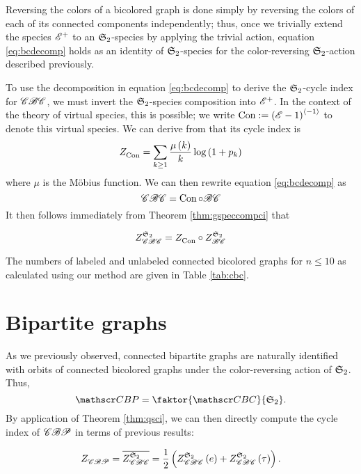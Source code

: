 \documentclass[sectionflow,singlespace,twoside,boldmathhdr,draft]{brandiss} %
\numberwithin{section}{chapter}
\numberwithin{figure}{chapter}
\begin{document}
Reversing the colors of a bicolored graph is done simply by reversing the colors of each of its connected components independently; thus, once we trivially extend the species $\specname{E}^{+}$ to an $\symgp{2}$-species by applying the trivial action, equation \eqref{eq:bcdecomp} holds as an identity of $\symgp{2}$-species for the color-reversing $\symgp{2}$-action described previously.

To use the decomposition in equation \eqref{eq:bcdecomp} to derive the $\symgp{2}$-cycle index for $\specname{CBC}$, we must invert the $\symgp{2}$-species composition into $\specname{E}^{+}$.
In the context of the theory of virtual species, this is possible; we write $\con := \pbrac{\specname{E} - 1}^{\abrac{-1}}$ to denote this virtual species.
We can derive from \cite[\S 2.5, eq.~(58c)]{bll:species} that its cycle index is
\begin{equation}
  \label{eq:zgamma}
  \ci{\con} = \sum_{k \geq 1} \frac{\mu \pbrac{k}}{k} \log \pbrac{1 + p_{k}}
\end{equation}
where $\mu$ is the M\"{o}bius function.
We can then rewrite equation \eqref{eq:bcdecomp} as
\[\specname{CBC} = \con \circ \specname{BC}\]
It then follows immediately from Theorem \ref{thm:gspeccompci} that
\begin{theorem}
  \begin{equation} \gci{\symgp{2}}{\specname{CBC}} = \ci{\con} \circ \gci{\symgp{2}}{\specname{BC}} \label{eq:zcbcdecomp} \end{equation}
\end{theorem}

The numbers of labeled and unlabeled connected bicolored graphs for $n \leq 10$ as calculated using our method are given in Table \ref{tab:cbc}.

\section{Bipartite graphs}\label{s:bp}
As we previously observed, connected bipartite graphs are naturally identified with orbits of connected bicolored graphs under the color-reversing action of $\symgp{2}$.
Thus,
\begin{equation*}
  \specname{CBP} = \faktor{\specname{CBC}}{\symgp{2}}.
\end{equation*}
By application of Theorem \ref{thm:qsci}, we can then directly compute the cycle index of $\specname{CBP}$ in terms of previous results:
\begin{theorem}
  \begin{equation}
    \ci{\specname{CBP}} = \qgci{\symgp{2}}{\specname{CBC}} = \frac{1}{2} \pbrac{\gci{\symgp{2}}{\specname{CBC}} \pbrac{e} + \gci{\symgp{2}}{\specname{CBC}} \pbrac{\tau}}.
  \end{equation}
\end{theorem}
\end{document}
